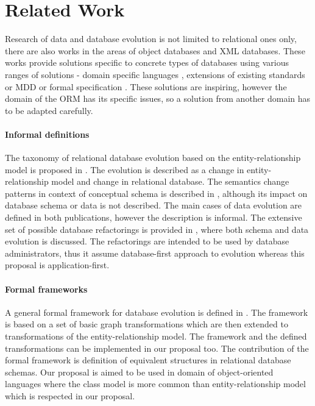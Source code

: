 \documentclass[runningheads]{comsis}
\begin{document}
\section{Related Work}
\label{sec:related-work}
Research of data and database evolution is not limited to relational ones only, there are also works in the areas of object databases and XML databases. These works provide solutions specific to concrete types of databases using various ranges of solutions - domain specific languages \cite{SERF}, extensions of existing standards or MDD \cite{Evolution_vs_Reorganization} or formal specification \cite{Tresch:1991vi}. These solutions are inspiring, however the domain of the ORM has its specific issues, so a solution from another domain has to be adapted carefully.

\paragraph{Informal definitions} The taxonomy of relational database evolution based on the entity-relationship model  is proposed in \cite{Roddick:TaxonomyOnERM}. The evolution is described as a change in entity-relationship model and change in relational database.  The semantics change patterns in context of conceptual schema is described in \cite{Wedemeijer:SemanticChangePatternsInConceptualSchema}, although its impact on database schema or data is not described. The main cases of data evolution are defined in both publications, however the description is informal. The extensive set of possible database refactorings is provided in \cite{Ambler:DbRefactoringBook}, where both schema and data evolution is discussed. The refactorings are intended to be used by database administrators, thus it assume database-first approach to evolution whereas this proposal is application-first.   

\paragraph{Formal frameworks} A general formal framework for database evolution is defined in \cite{McBrien:formal-framework-transformation}. The framework is based on a set of basic graph transformations which are then extended to transformations of the entity-relationship model. The framework and the defined transformations can be implemented in our proposal too. The contribution of the formal framework is definition of equivalent structures in relational database schemas. Our proposal is aimed to be used in domain of object-oriented languages where the class model is more common than entity-relationship model which is respected in our proposal. 
\end{document}
